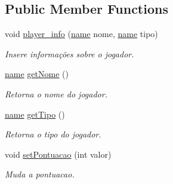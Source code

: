 \subsection*{Public Member Functions}
\begin{DoxyCompactItemize}
\item 
\mbox{\label{structpl_1_1Player_a5d473ba311f5d766e71aa9c2c398ffa1}} 
void \hyperlink{structpl_1_1Player_a5d473ba311f5d766e71aa9c2c398ffa1}{player\+\_\+info} (\hyperlink{structpl_1_1Player_a77a12ed18c2601e66b9357ce1a2c1d2b}{name} nome, \hyperlink{structpl_1_1Player_a77a12ed18c2601e66b9357ce1a2c1d2b}{name} tipo)
\begin{DoxyCompactList}\small\item\em Insere informações sobre o jogador. \end{DoxyCompactList}\item 
\mbox{\label{structpl_1_1Player_a664fdfbde3793d62db545220f0a5601e}} 
\hyperlink{structpl_1_1Player_a77a12ed18c2601e66b9357ce1a2c1d2b}{name} \hyperlink{structpl_1_1Player_a664fdfbde3793d62db545220f0a5601e}{get\+Nome} ()
\begin{DoxyCompactList}\small\item\em Retorna o nome do jogador. \end{DoxyCompactList}\item 
\mbox{\label{structpl_1_1Player_ab2c0f82dc25ae7124c739188f6a29e9e}} 
\hyperlink{structpl_1_1Player_a77a12ed18c2601e66b9357ce1a2c1d2b}{name} \hyperlink{structpl_1_1Player_ab2c0f82dc25ae7124c739188f6a29e9e}{get\+Tipo} ()
\begin{DoxyCompactList}\small\item\em Retorna o tipo do jogador. \end{DoxyCompactList}\item 
\mbox{\label{structpl_1_1Player_aa0d7f3f77dac8fb513894f2954110270}} 
void \hyperlink{structpl_1_1Player_aa0d7f3f77dac8fb513894f2954110270}{set\+Pontuacao} (int valor)
\begin{DoxyCompactList}\small\item\em Muda a pontuacao. \end{DoxyCompactList}\item 
\mbox{\label{structpl_1_1Player_a28cc93228bd7a418e44c5e03ff15c07e}} 

\end{DoxyCompactItemize}

